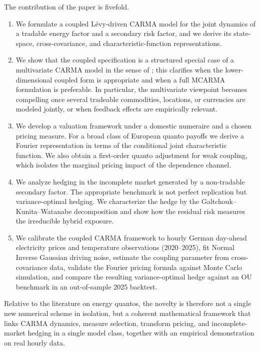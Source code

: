 \documentclass[10pt,a4paper,reqno]{amsart}
\newcommand{\1}{\mathbbm{1}}
\begin{document}
The contribution of the paper is fivefold.
\begin{enumerate}[label=(\roman*)]
  \item We formulate a coupled Lévy-driven CARMA model for the joint dynamics of
    a tradable energy factor and a secondary risk factor, and we derive its
    state-space, cross-covariance, and characteristic-function representations.
  \item We show that the coupled specification is a structured special case of a
    multivariate CARMA model in the sense of \citet{Mar07}; this clarifies when
    the lower-dimensional coupled form is appropriate and when a full MCARMA
    formulation is preferable. In particular, the multivariate viewpoint becomes
    compelling once several tradeable commodities, locations, or currencies are
    modeled jointly, or when feedback effects are empirically relevant.
  \item We develop a valuation framework under a domestic numeraire and a chosen
    pricing measure. For a broad class of European quanto payoffs we derive a
    Fourier representation in terms of the conditional joint characteristic
    function. We also obtain a first-order quanto adjustment for weak coupling,
    which isolates the marginal pricing impact of the dependence channel.
  \item We analyze hedging in the incomplete market generated by a non-tradable
    secondary factor. The appropriate benchmark is not perfect replication but
    variance-optimal hedging. We characterize the hedge by the
    Galtchouk--Kunita--Watanabe decomposition and show how the residual risk
    measures the irreducible hybrid exposure.
  \item We calibrate the coupled CARMA framework to hourly German day-ahead
    electricity prices and temperature observations (2020--2025), fit
    Normal Inverse Gaussian driving noise, estimate the coupling parameter from
    cross-covariance data, validate the Fourier pricing formula against Monte
    Carlo simulation, and compare the resulting variance-optimal hedge against
    an OU benchmark in an out-of-sample 2025 backtest.
\end{enumerate}

Relative to the literature on energy quantos, the novelty is therefore not a
single new numerical scheme in isolation, but a coherent mathematical framework
that links CARMA dynamics, measure selection, transform pricing, and
incomplete-market hedging in a single model class, together with an empirical
demonstration on real hourly data.
\end{document}
